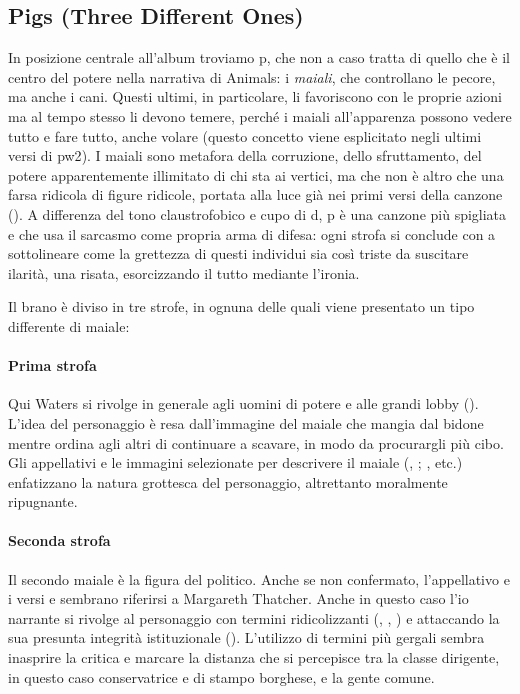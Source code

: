 \documentclass[class=book, crop=false, oneside, 12pt]{standalone}
\begin{document}
    \subsection{Pigs (Three Different Ones)}
    In posizione centrale all'album troviamo \acrfull{p}, che non a caso tratta di quello che è il centro del potere nella narrativa di Animals: i \emph{maiali}, che controllano le pecore, ma anche i cani. Questi ultimi, in particolare, li favoriscono con le proprie azioni ma al tempo stesso li devono temere, perché i maiali all'apparenza possono vedere tutto e fare tutto, anche volare (questo concetto viene esplicitato negli ultimi versi di \acrshort{pw2}). I maiali sono metafora della corruzione, dello sfruttamento, del potere apparentemente illimitato di chi sta ai vertici, ma che non è altro che una farsa ridicola di figure ridicole, portata alla luce già nei primi versi della canzone (). A differenza del tono claustrofobico e cupo di \acrshort{d}, \acrshort{p} è una canzone più spigliata e che usa il sarcasmo come propria arma di difesa: ogni strofa si conclude con  a sottolineare come la grettezza di questi individui sia così triste da suscitare ilarità, una risata, esorcizzando il tutto mediante l'ironia. 
    
    Il brano è diviso in tre strofe, in ognuna delle quali viene presentato un tipo differente di maiale:

    \paragraph{Prima strofa} Qui Waters si rivolge in generale agli uomini di potere e alle grandi lobby (). L'idea del personaggio è resa dall'immagine del maiale che mangia dal bidone mentre ordina agli altri di continuare a scavare, in modo da procurargli più cibo. Gli appellativi e le immagini selezionate per descrivere il maiale (, ; , etc.) enfatizzano la natura grottesca del personaggio, altrettanto moralmente ripugnante.

    \paragraph{Seconda strofa} Il secondo maiale è la figura del politico. Anche se non confermato, l'appellativo  e i versi  e  sembrano riferirsi a Margareth Thatcher. Anche in questo caso l'io narrante si rivolge al personaggio con termini ridicolizzanti (, , ) e attaccando la sua presunta integrità istituzionale (). L'utilizzo di termini più gergali sembra inasprire la critica e marcare la distanza che si percepisce tra la classe dirigente, in questo caso conservatrice e di stampo borghese, e la gente comune.
\end{document}
